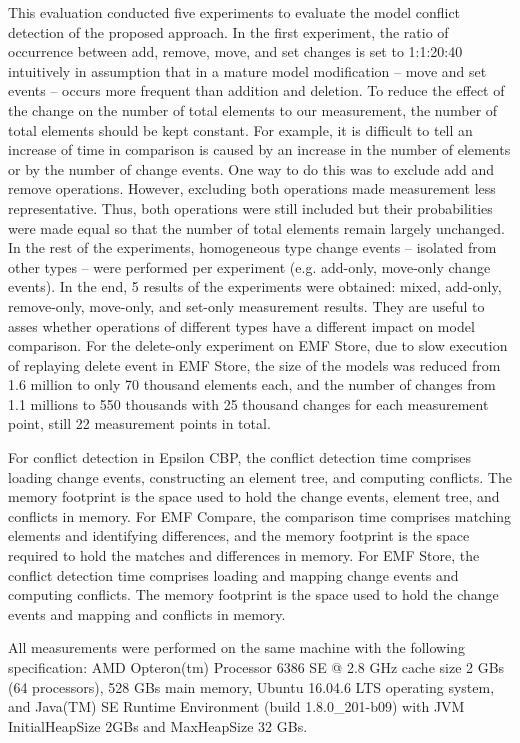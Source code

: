 This evaluation conducted five experiments to evaluate the model conflict detection of the proposed approach. In the first experiment, the ratio of occurrence between \textsf{add}, \textsf{remove}, \textsf{move}, and \textsf{set} changes is set to 1:1:20:40 intuitively in assumption that in a mature model modification -- \textsf{move} and \textsf{set} events -- occurs more frequent than addition and deletion. To reduce the effect of the change on the number of total elements to our measurement, the number of total elements should be kept constant. For example, it is difficult to tell an increase of time in comparison is caused by an increase in the number of elements or by the number of change events. One way to do this was to exclude \textsf{add} and \textsf{remove} operations. However, excluding both operations made measurement less representative. Thus, both operations were still included but their probabilities were made equal so that the number of total elements remain largely unchanged. In the rest of the experiments,
homogeneous type change events -- isolated from other types -- were performed per experiment (e.g. add-only, move-only change events). In the end, 5 results of the experiments were obtained: mixed, add-only, remove-only, move-only, and set-only measurement results. They are useful to asses whether operations of different types have a different impact on model comparison. For the delete-only experiment on EMF Store, due to slow execution of replaying \textsf{delete} event in EMF Store, the size of the models was reduced from 1.6 million to only 70 thousand elements each, and the number of changes from 1.1 millions to 550 thousands with 25 thousand changes for each measurement point, still 22 measurement points in total.

For conflict detection in Epsilon CBP, the conflict detection time comprises loading change events, constructing an element tree, and computing conflicts. The memory footprint is the space used to hold the change events, element tree, and conflicts in memory. For EMF Compare, the comparison time comprises matching elements and identifying differences, and the memory footprint is the space required to hold the matches and differences in memory. For EMF Store, the conflict detection time comprises loading and mapping change events and computing conflicts. The memory footprint is the space used to hold the change events and mapping and conflicts in memory.

All measurements were performed on the same machine with the following specification: AMD Opteron(tm) Processor 6386 SE @ 2.8 GHz cache size 2 GBs (64 processors), 528 GBs main memory, Ubuntu 16.04.6 LTS operating system, and Java(TM) SE Runtime Environment (build 1.8.0\_201-b09) with JVM \textsf{InitialHeapSize} 2GBs and \textsf{MaxHeapSize} 32 GBs.

